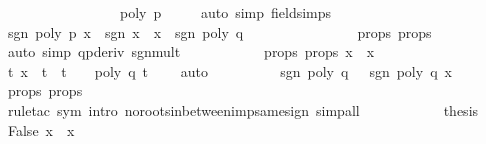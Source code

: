 \begin{isabellebody}
\ \ \ \ \ \ \ \ \ \ \ \ \ \ \ \ \ {\isachardoublequoteopen}poly\ p\ {\isasymxi}\ {\isasymnoteq}\ {}{\isachardoublequoteclose}\ \isamarkupfalse%
\ {\isacharparenleft}auto\ simp{\isacharcolon}\ field{\isacharunderscore}simps{\isacharparenright}\isanewline
\ \ \ \ \ \ \ \ \isamarkupfalse%
\ {\isachardoublequoteopen}sgn\ {\isacharparenleft}poly\ p\ x{\isacharparenright}\ {\isacharequal}\ sgn\ {\isacharparenleft}x\ {\isacharminus}\ x\ {\isacharasterisk}\ sgn\ {\isacharparenleft}poly\ q\ {\isasymxi}{\isacharparenright}{\isachardoublequoteclose}\ \isanewline
\ \ \ \ \ \ \ \ \ \ \ \ \isamarkupfalse%
\ {\isasymepsilon}{\isacharunderscore}props\ {\isasymxi}{\isacharunderscore}props\ \isamarkupfalse%
\ {\isacharparenleft}auto\ simp{\isacharcolon}\ q{\isacharunderscore}pderiv\ sgn{\isacharunderscore}mult{\isacharparenright}\isanewline
\ \ \ \ \ \ \ \ \isamarkupfalse%
\ \isamarkupfalse%
\ {\isasymxi}{\isacharunderscore}props\ {\isasymepsilon}{\isacharunderscore}props\ {\isacharbackquoteopen}{\isasymbar}x\ {\isacharminus}\ x\ {\isacharless}\ {\isasymepsilon}{\isacharbackquoteclose}\ \isanewline
\ \ \ \ \ \ \ \ \ \ \ \ \isamarkupfalse%
\ {\isachardoublequoteopen}{\isasymforall}t{\isachardot}\ x\ {\isasymle}\ t\ {\isasymand}\ t\ {\isasymle}\ {\isasymxi}\ {\isasymlongrightarrow}\ poly\ q\ t\ {\isasymnoteq}\ {}{\isachardoublequoteclose}\ \isamarkupfalse%
\ auto\isanewline
\ \ \ \ \ \ \ \ \isamarkupfalse%
\ {\isachardoublequoteopen}sgn\ {\isacharparenleft}poly\ q\ {\isasymxi}{\isacharparenright}\ {\isacharequal}\ sgn\ {\isacharparenleft}poly\ q\ x{\isacharparenright}{\isachardoublequoteclose}\ \isamarkupfalse%
\ {\isasymxi}{\isacharunderscore}props\ {\isasymepsilon}{\isacharunderscore}props\isanewline
\ \ \ \ \ \ \ \ \ \ \ \ \isamarkupfalse%
\ {\isacharparenleft}rule{\isacharunderscore}tac\ sym{\isacharcomma}\ intro\ no{\isacharunderscore}roots{\isacharunderscore}inbetween{\isacharunderscore}imp{\isacharunderscore}same{\isacharunderscore}sign{\isacharcomma}\ simp{\isacharunderscore}all{\isacharparenright}\isanewline
\ \ \ \ \ \ \ \ \isamarkupfalse%
\ \isamarkupfalse%
\ {\isacharquery}thesis\ \isamarkupfalse%
\ False\ {\isacharbackquoteopen}x\ {\isasymnoteq}\ x\ \isanewline
\ \ \ \ \ \ \ \ \ \ \ \ \isamarkupfalse%

\end{isabellebody}
